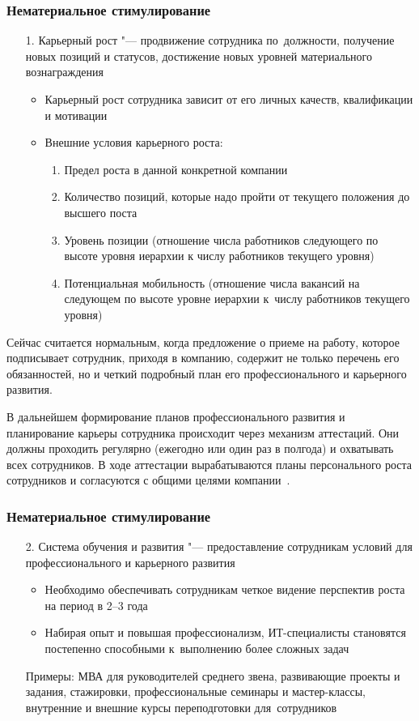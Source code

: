 \documentclass{../industrial-development}
\begin{document}
\begin{frame} \frametitle{Нематериальное стимулирование}
			 \begin{itemize}
			\item[1.] \alert{Карьерный рост} "--- продвижение сотрудника по~должности, получение новых позиций и статусов, достижение новых уровней материального вознаграждения
			  \begin{itemize}
					
			\item Карьерный рост сотрудника зависит от его личных качеств, квалификации и мотивации
			\item Внешние условия карьерного роста:
			 \begin{enumerate}
			\item Предел роста в данной конкретной компании
			\item Количество позиций, которые надо пройти от текущего положения до высшего поста
			\item Уровень позиции (отношение числа работников следующего по высоте уровня иерархии к числу работников текущего уровня)
			\item Потенциальная мобильность (отношение числа вакансий на следующем по высоте уровне иерархии к~числу работников текущего уровня)
			 \end{enumerate}
			 \end{itemize}
	  \end{itemize}
\end{frame}

\lecturenotes

Сейчас считается нормальным, когда предложение о приеме на работу, которое подписывает сотрудник, приходя в компанию, содержит не только перечень его обязанностей, но и четкий подробный план его профессионального и карьерного развития.

В дальнейшем формирование планов профессионального развития и планирование карьеры сотрудника происходит через механизм аттестаций. Они должны проходить регулярно (ежегодно или один раз в полгода) и охватывать всех сотрудников. В ходе аттестации вырабатываются планы персонального роста сотрудников и согласуются с общими целями компании~\cite{TriKitMotiv}.

\begin{frame} \frametitle{Нематериальное стимулирование}
	 \begin{itemize}					
\item[2.] \alert{Система обучения и развития} "--- предоставление сотрудникам условий для профессионального и карьерного развития
	\begin{itemize}
\item Необходимо обеспечивать сотрудникам четкое видение перспектив роста на период в 2--3 года
	\item Набирая опыт и повышая профессионализм, ИТ-специалисты
	становятся постепенно способными к~выполнению более сложных задач
	  \end{itemize}
	Примеры: МВА для руководителей среднего звена, развивающие проекты и задания, стажировки, профессиональные семинары и мастер-классы, внутренние и внешние курсы переподготовки для~сотрудников
	  \end{itemize}
\end{frame}
\end{document}
